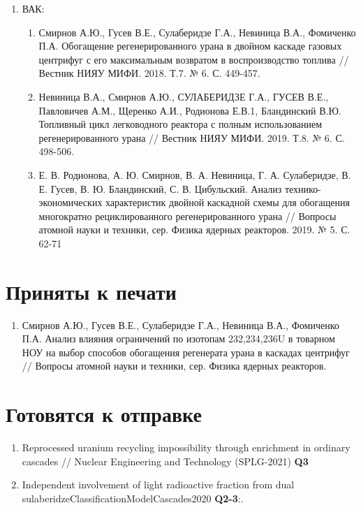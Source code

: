 \begin{enumerate}
\begin{enumerate}
    \end{enumerate}
    \item ВАК:
    \begin{enumerate}
        \item Смирнов А.Ю., Гусев В.Е., Сулаберидзе Г.А., Невиница В.А., Фомиченко П.А. Обогащение регенерированного урана в двойном каскаде газовых центрифуг с его максимальным возвратом в воспроизводство топлива // Вестник НИЯУ МИФИ. 2018. Т.7. № 6. С. 449-457.
        \item 	Невиница В.А., Смирнов А.Ю., СУЛАБЕРИДЗЕ Г.А., ГУСЕВ В.Е., Павловичев А.М., Щеренко А.И., Родионова Е.В.1, Бландинский В.Ю. Топливный цикл легководного реактора с полным использованием регенерированного урана // Вестник НИЯУ МИФИ. 2019. Т.8. № 6. С. 498-506.
        \item Е. В. Родионова, А. Ю. Смирнов, В. А. Невиница, Г. А. Сулаберидзе, В. Е. Гусев, В. Ю. Бландинский, С. В. Цибульский. Анализ технико-экономических характеристик двойной каскадной схемы для обогащения многократно рециклированного регенерированного урана // Вопросы атомной науки и техники, сер. Физика ядерных реакторов. 2019. № 5. С. 62-71
        \end{enumerate}
\end{enumerate}

\section{Приняты к печати}
\begin{enumerate}
    \item Смирнов А.Ю., Гусев В.Е., Сулаберидзе Г.А., Невиница В.А., Фомиченко П.А. Анализ влияния ограничений по изотопам 232,234,236U в товарном НОУ на выбор способов обогащения регенерата урана в каскадах центрифуг //  Вопросы атомной науки и техники, сер. Физика ядерных реакторов.
\end{enumerate}

\section{Готовятся к отправке}
\begin{enumerate}
    \item Reprocessed uranium recycling impossibility through enrichment in ordinary cascades // Nuclear Engineering and Technology (SPLG-2021) \textbf{Q3}
    \item Independent involvement of light radioactive fraction from dual sulaberidzeClassificationModelCascades2020 \textbf{Q2-3}:.
\end{enumerate}

